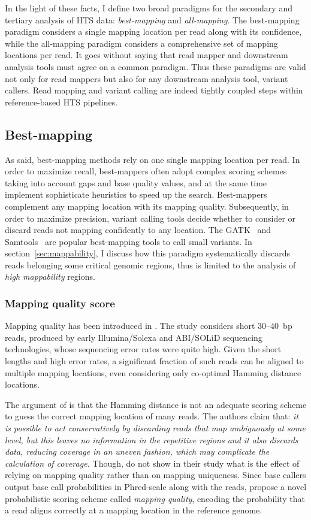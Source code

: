In the light of these facts, I define two broad paradigms for the secondary and tertiary analysis of HTS data: \emph{best-mapping} and \emph{all-mapping}.
The best-mapping paradigm considers a single mapping location per read along with its confidence, while the all-mapping paradigm considers a comprehensive set of mapping locations per read.
It goes without saying that read mapper and downstream analysis tools must agree on a common paradigm.
Thus these paradigms are valid not only for read mappers but also for any downstream analysis tool, \eg variant callers.
Read mapping and variant calling are indeed tightly coupled steps within reference-based HTS pipelines.

\subsection{Best-mapping}
As said, best-mapping methods rely on one single mapping location per read.
In order to maximize recall, best-mappers often adopt complex scoring schemes taking into account gaps and base quality values, and at the same time implement sophisticate heuristics to speed up the search.
Best-mappers complement any mapping location with its mapping quality.
Subsequently, in order to maximize precision, variant calling tools decide whether to consider or discard reads not mapping confidently to any location.
The GATK~\citep{DePristo2011} and Samtools~\citep{Li2009a} are popular best-mapping tools to call small variants.
In section~\ref{sec:mappability}, I discuss how this paradigm systematically discards reads belonging some critical genomic regions, thus is limited to the analysis of \emph{high mappability} regions.

\subsubsection{Mapping quality score}
\label{sec:paradigms:mapqual}

Mapping quality has been introduced in \citep{Li2008}.
The study considers short 30--40~bp reads, produced by early Illumina/Solexa and ABI/SOLiD sequencing technologies, whose sequencing error rates were quite high.
Given the short lengths and high error rates, a significant fraction of such reads can be aligned to multiple mapping locations, even considering only co-optimal Hamming distance locations.

The argument of \citeauthor{Li2008} is that the Hamming distance is not an adequate scoring scheme to guess the correct mapping location of many reads.
The authors claim that: \emph{it is possible to act conservatively by discarding reads that map ambiguously at some level, but this leaves no information in the repetitive regions and it also discards data, reducing coverage in an uneven fashion, which may complicate the calculation of coverage.}
Though, \citeauthor{Li2008} do not show in their study what is the effect of relying on mapping quality rather than on mapping uniqueness.
Since base callers output base call probabilities in Phred-scale along with the reads, \citeauthor{Li2008} propose a novel probabilistic scoring scheme called \emph{mapping quality}, encoding the probability that a read aligns correctly at a mapping location in the reference genome.

